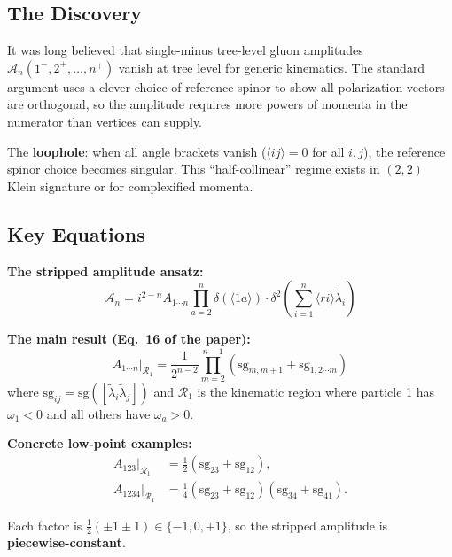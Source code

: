 \subsection{The Discovery}

It was long believed that single-minus tree-level gluon amplitudes $\mathcal{A}_n(1^-,2^+,\dots,n^+)$ vanish at tree level for generic kinematics. The standard argument uses a clever choice of reference spinor to show all polarization vectors are orthogonal, so the amplitude requires more powers of momenta in the numerator than vertices can supply.

The \textbf{loophole}: when all angle brackets vanish ($\langle ij\rangle = 0$ for all $i,j$), the reference spinor choice becomes singular. This ``half-collinear'' regime exists in $(2,2)$ Klein signature or for complexified momenta.

\subsection{Key Equations}

\textbf{The stripped amplitude ansatz:}
\begin{equation}
\mathcal{A}_n = i^{2-n} A_{1\cdots n} \prod_{a=2}^{n} \delta(\langle 1a\rangle) \cdot \delta^2\!\left(\sum_{i=1}^{n} \langle ri\rangle \tilde\lambda_i\right)
\end{equation}

\textbf{The main result (Eq.~16 of the paper):}
\begin{equation}
A_{1\cdots n}\Big|_{\mathcal{R}_1} = \frac{1}{2^{n-2}} \prod_{m=2}^{n-1} \left(\mathrm{sg}_{m,m+1} + \mathrm{sg}_{1,2\cdots m}\right)
\label{eq:smga-main}
\end{equation}
where $\mathrm{sg}_{ij} = \mathrm{sg}([\tilde\lambda_i \tilde\lambda_j])$ and $\mathcal{R}_1$ is the kinematic region where particle 1 has $\omega_1 < 0$ and all others have $\omega_a > 0$.

\textbf{Concrete low-point examples:}
\begin{align}
A_{123}\big|_{\mathcal{R}_1} &= \tfrac{1}{2}(\mathrm{sg}_{23} + \mathrm{sg}_{12}), \\
A_{1234}\big|_{\mathcal{R}_1} &= \tfrac{1}{4}(\mathrm{sg}_{23} + \mathrm{sg}_{12})(\mathrm{sg}_{34} + \mathrm{sg}_{41}).
\end{align}

Each factor is $\frac{1}{2}(\pm 1 \pm 1) \in \{-1, 0, +1\}$, so the stripped amplitude is \textbf{piecewise-constant}.

